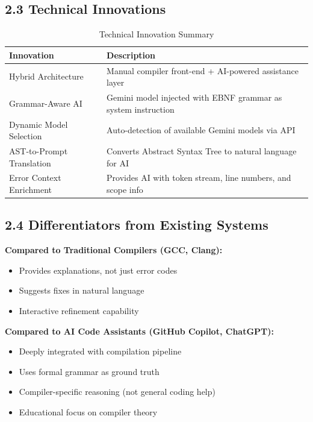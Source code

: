 \documentclass[a4paper,11pt]{article}
\begin{document}
\subsection{2.3 Technical Innovations}

\begin{table}[H]
\centering
\begin{tabularx}{\textwidth}{|l|X|}
\hline
\rowcolor{blue!10}
\textbf{Innovation} & \textbf{Description} \\
\hline
Hybrid Architecture & Manual compiler front-end + AI-powered assistance layer \\
\hline
Grammar-Aware AI & Gemini model injected with EBNF grammar as system instruction \\
\hline
Dynamic Model Selection & Auto-detection of available Gemini models via API \\
\hline
AST-to-Prompt Translation & Converts Abstract Syntax Tree to natural language for AI \\
\hline
Error Context Enrichment & Provides AI with token stream, line numbers, and scope info \\
\hline
\end{tabularx}
\caption{Technical Innovation Summary}
\end{table}

\subsection{2.4 Differentiators from Existing Systems}

\textbf{Compared to Traditional Compilers (GCC, Clang):}
\begin{itemize}
    \item Provides explanations, not just error codes
    \item Suggests fixes in natural language
    \item Interactive refinement capability
\end{itemize}

\textbf{Compared to AI Code Assistants (GitHub Copilot, ChatGPT):}
\begin{itemize}
    \item Deeply integrated with compilation pipeline
    \item Uses formal grammar as ground truth
    \item Compiler-specific reasoning (not general coding help)
    \item Educational focus on compiler theory
\end{itemize}
\end{document}
